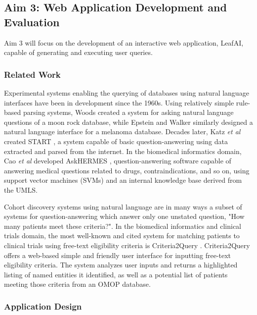 \documentclass[../main.tex]{subfiles}
\begin{document}
\subsection{Aim 3: Web Application Development and Evaluation}

Aim 3 will focus on the development of an interactive web application, LeafAI, capable of generating and executing user queries. 

\subsubsection{Related Work}

Experimental systems enabling the querying of databases using natural language interfaces have been in development since the 1960s. Using relatively simple rule-based parsing systems, Woods \cite{woods1973progress} created a system for asking natural language questions of a moon rock database, while Epstein and Walker \cite{epstein1978natural} similarly designed a natural language interface for a melanoma database. Decades later, Katz \textit{et al} created START \cite{katz1999integrating}, a system capable of basic question-answering using data extracted and parsed from the internet. In the biomedical informatics domain, Cao \textit{et al} developed AskHERMES \cite{cao2011askhermes}, question-answering software capable of answering medical questions related to drugs, contraindications, and so on, using support vector machines (SVMs) and an internal knowledge base derived from the UMLS.

Cohort discovery systems using natural language are in many ways a subset of systems for question-answering which answer only one unstated question, "How many patients meet these criteria?". In the biomedical informatics and clinical trials domain, the most well-known and cited system for matching patients to clinical trials using free-text eligibility criteria is Criteria2Query \cite{yuan2019criteria2query, fang2022combining}. Criteria2Query offers a web-based simple and friendly user interface for inputting free-text eligibility criteria. The system analyzes user inputs and returns a highlighted listing of named entities it identified, as well as a potential list of patients meeting those criteria from an OMOP database.

\subsubsection{Application Design}
\end{document}

